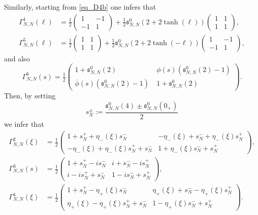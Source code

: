 \documentclass[11pt]{article}
\def\s{\mathfrak s}
\begin{document}
Similarly, starting from \eqref{eq_D4b} one infers that
\begin{align*}
\Gamma^1_{N,N}(\ell) & =\tfrac12\left(\begin{smallmatrix}
    1 & -1\\
    -1 & 1
\end{smallmatrix}\right)+\tfrac12 \s^0_{N,N}(2+2\tanh(\ell))\left(\begin{smallmatrix}
    1 & 1\\
    1 & 1
\end{smallmatrix}\right), \\
\Gamma^5_{N,N}(\ell) & =\tfrac12\left(\begin{smallmatrix}
    1 & 1\\
    1 & 1
\end{smallmatrix}\right)+\tfrac12 \s^0_{N,N}(2+2\tanh(-\ell))\left(\begin{smallmatrix}
    1 & -1\\
    -1 & 1
\end{smallmatrix}\right), 
\end{align*}
and also
\begin{equation*}
\Gamma^6_{N,N}(s)  = \tfrac12\left(\begin{smallmatrix}
    1+  \s^0_{N,N}(2)  & \ \phi(s)( \s^0_{N,N}(2) -1)\\
    \overline{\phi}(s)( \s^0_{N,N}(2) -1)  &\   1+  \s^0_{N,N}(2) 
\end{smallmatrix}\right).
\end{equation*}
Then, by setting 
$$
s_N^\pm:=\frac{\s^0_{N,N}(4)\pm \s^0_{N,N}(0_+)}{2}
$$ 
we infer that 
\begin{align*}
\Gamma^2_{N,N}(\xi)
& =\tfrac12\left(\begin{smallmatrix}
    1+s_{N}^++\eta_-(\xi)s_{N}^- & -\eta_-(\xi)+s_{N}^-+\eta_-(\xi)s_{N}^+\\
    -\eta_-(\xi) +\eta_-(\xi)s_{N}^++s_{N}^- & 1+ \eta_-(\xi)s_{N}^-+s_{N}^+
\end{smallmatrix}\right), \\
\Gamma^3_{N,N}(s)
& =\tfrac12\left(\begin{smallmatrix}
    1+s_{N}^+-is_{N}^- & i+s_{N}^--is_{N}^+\\
    i -is_{N}^++s_{N}^- & 1- is_{N}^-+s_{N}^+
\end{smallmatrix}\right), \\
\Gamma^4_{N,N}(\xi)
& =\tfrac12\left(\begin{smallmatrix}
    1+s_{N}^+-\eta_+(\xi)s_{N}^- & \eta_+(\xi)+s_{N}^--\eta_+(\xi)s_{N}^+\\
    \eta_+(\xi) -\eta_+(\xi)s_{N}^++s_{N}^- & 1- \eta_+(\xi)s_{N}^-+s_{N}^+
\end{smallmatrix}\right).
\end{align*}
\end{document}
